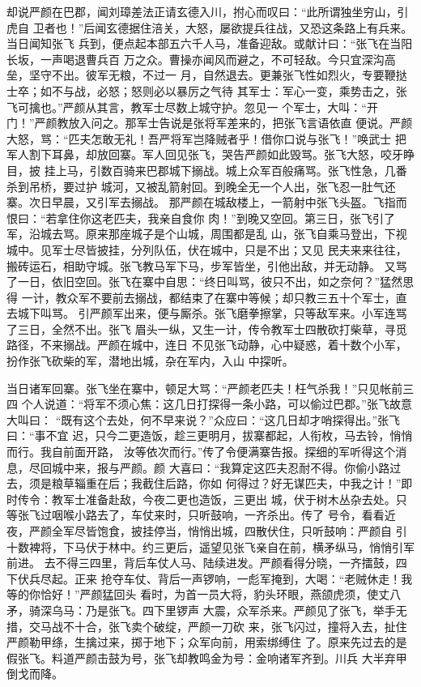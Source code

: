 却说严颜在巴郡，闻刘璋差法正请玄德入川，拊心而叹曰：“此所谓独坐穷山，引虎自
卫者也！”后闻玄德据住涪关，大怒，屡欲提兵往战，又恐这条路上有兵来。当日闻知张飞
兵到，便点起本部五六千人马，准备迎敌。或献计曰：“张飞在当阳长坂，一声喝退曹兵百
万之众。曹操亦闻风而避之，不可轻敌。今只宜深沟高垒，坚守不出。彼军无粮，不过一
月，自然退去。更兼张飞性如烈火，专要鞭挞士卒；如不与战，必怒；怒则必以暴厉之气待
其军士：军心一变，乘势击之，张飞可擒也。”严颜从其言，教军士尽数上城守护。忽见一
个军士，大叫：“开门！”严颜教放入问之。那军士告说是张将军差来的，把张飞言语依直
便说。严颜大怒，骂：“匹夫怎敢无礼！吾严将军岂降贼者乎！借你口说与张飞！”唤武士
把军人割下耳鼻，却放回寨。军人回见张飞，哭告严颜如此毁骂。张飞大怒，咬牙睁目，披
挂上马，引数百骑来巴郡城下搦战。城上众军百般痛骂。张飞性急，几番杀到吊桥，要过护
城河，又被乱箭射回。到晚全无一个人出，张飞忍一肚气还寨。次日早晨，又引军去搦战。
那严颜在城敌楼上，一箭射中张飞头盔。飞指而恨曰：“若拿住你这老匹夫，我亲自食你
肉！”到晚又空回。第三日，张飞引了军，沿城去骂。原来那座城子是个山城，周围都是乱
山，张飞自乘马登出，下视城中。见军士尽皆披挂，分列队伍，伏在城中，只是不出；又见
民夫来来往往，搬砖运石，相助守城。张飞教马军下马，步军皆坐，引他出敌，并无动静。
又骂了一日，依旧空回。张飞在寨中自思：“终日叫骂，彼只不出，如之奈何？”猛然思得
一计，教众军不要前去搦战，都结束了在寨中等候；却只教三五十个军士，直去城下叫骂。
引严颜军出来，便与厮杀。张飞磨拳擦掌，只等敌军来。小军连骂了三日，全然不出。张飞
眉头一纵，又生一计，传令教军士四散砍打柴草，寻觅路径，不来搦战。严颜在城中，连日
不见张飞动静，心中疑惑，着十数个小军，扮作张飞砍柴的军，潜地出城，杂在军内，入山
中探听。

当日诸军回寨。张飞坐在寨中，顿足大骂：“严颜老匹夫！枉气杀我！”只见帐前三四
个人说道：“将军不须心焦：这几日打探得一条小路，可以偷过巴郡。”张飞故意大叫曰：
“既有这个去处，何不早来说？”众应曰：“这几日却才哨探得出。”张飞曰：“事不宜
迟，只今二更造饭，趁三更明月，拔寨都起，人衔枚，马去铃，悄悄而行。我自前面开路，
汝等依次而行。”传了令便满寨告报。探细的军听得这个消息，尽回城中来，报与严颜。颜
大喜曰：“我算定这匹夫忍耐不得。你偷小路过去，须是粮草辎重在后；我截住后路，你如
何得过？好无谋匹夫，中我之计！”即时传令：教军士准备赴敌，今夜二更也造饭，三更出
城，伏于树木丛杂去处。只等张飞过咽喉小路去了，车仗来时，只听鼓响，一齐杀出。传了
号令，看看近夜，严颜全军尽皆饱食，披挂停当，悄悄出城，四散伏住，只听鼓响：严颜自
引十数裨将，下马伏于林中。约三更后，遥望见张飞亲自在前，横矛纵马，悄悄引军前进。
去不得三四里，背后车仗人马、陆续进发。严颜看得分晓，一齐擂鼓，四下伏兵尽起。正来
抢夺车仗、背后一声锣响，一彪军掩到，大喝：“老贼休走！我等的你恰好！”严颜猛回头
看时，为首一员大将，豹头环眼，燕颌虎须，使丈八矛，骑深乌马：乃是张飞。四下里锣声
大震，众军杀来。严颜见了张飞，举手无措，交马战不十合，张飞卖个破绽，严颜一刀砍
来，张飞闪过，撞将入去，扯住严颜勒甲绦，生擒过来，掷于地下；众军向前，用索绑缚住
了。原来先过去的是假张飞。料道严颜击鼓为号，张飞却教鸣金为号：金响诸军齐到。川兵
大半弃甲倒戈而降。

